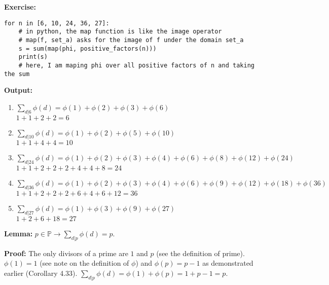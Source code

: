 \item \textbf{Exercise:}

\begin{verbatim}
for n in [6, 10, 24, 36, 27]:
	# in python, the map function is like the image operator
	# map(f, set_a) asks for the image of f under the domain set_a
    s = sum(map(phi, positive_factors(n)))
	print(s)
	# here, I am maping phi over all positive factors of n and taking the sum
\end{verbatim}

\textbf{Output:}
\begin{enumerate}
\item $\sum\limits_{d|6} \phi(d) = \phi(1) + \phi(2) + \phi(3) + \phi(6)$ \\ $1 + 1 + 2 + 2 = 6$
\item $\sum\limits_{d|10} \phi(d) = \phi(1) + \phi(2) + \phi(5) + \phi(10)$ \\ $1 + 1 + 4 + 4 = 10$
\item $\sum\limits_{d|24} \phi(d) = \phi(1) + \phi(2) + \phi(3) + \phi(4) + \phi(6) + \phi(8) + \phi(12) + \phi(24)$ \\ $1 + 1 + 2 + 2 + 2 + 4 + 4 + 8 = 24$
\item $\sum\limits_{d|36} \phi(d) = \phi(1) + \phi(2) + \phi(3) + \phi(4) + \phi(6) + \phi(9) + \phi(12) + \phi(18) + \phi(36)$ \\ $1 + 1 + 2 + 2 + 2 + 6 + 4 + 6 + 12 = 36$
\item $\sum\limits_{d|27} \phi(d) = \phi(1) + \phi(3) + \phi(9) + \phi(27)$ \\ $1 + 2 + 6 + 18 = 27$
\end{enumerate}

\item \textbf{Lemma:} \(p \in \mathbb P \rightarrow \sum\limits_{d|p} \phi(d) = p\).

\textbf{Proof:} The only divisors of a prime are \(1\) and \(p\) (see the definition of prime). \(\phi(1) = 1\) (see note on the definition of \(\phi\)) and \(\phi(p) = p-1\) as demonstrated earlier (Corollary 4.33). \(\sum\limits_{d|p} \phi(d) = \phi(1) + \phi(p) = 1 + p - 1 = p\). \qedhere

